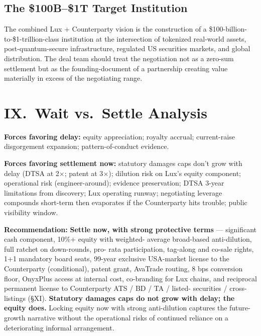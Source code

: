 \documentclass[11pt,letterpaper]{article}
\begin{document}
\subsection*{The \$100B--\$1T Target Institution}

The combined Lux + Counterparty vision is the construction of a
\$100-billion-to-\$1-trillion-class institution at the intersection
of tokenized real-world assets, post-quantum-secure infrastructure,
regulated US securities markets, and global distribution. The deal
team should treat the negotiation not as a zero-sum settlement but
as the founding-document of a partnership creating value materially
in excess of the negotiating range.

\section*{IX.\ Wait vs.\ Settle Analysis}

\textbf{Forces favoring delay:} equity appreciation; royalty accrual;
current-raise disgorgement expansion; pattern-of-conduct evidence.

\textbf{Forces favoring settlement now:} statutory damages caps don't
grow with delay (DTSA at 2$\times$; patent at 3$\times$); dilution risk
on Lux's equity component; operational risk (engineer-around); evidence
preservation; DTSA 3-year limitations from discovery; Lux operating
runway; negotiating leverage compounds short-term then evaporates if
the Counterparty hits trouble; public visibility window.

\textbf{Recommendation:} \textbf{Settle now, with strong protective
terms} --- significant cash component, 10\%+ equity with weighted-
average broad-based anti-dilution, full ratchet on down-rounds, pro-
rata participation, tag-along and co-sale rights, 1+1 mandatory board
seats, 99-year exclusive USA-market license to the Counterparty
(conditional), patent grant, AvaTrade routing, 8 bps conversion floor,
OnyxPlus access at internal cost, co-branding for Lux chains, and
reciprocal permanent license to Counterparty ATS / BD / TA / listed-
securities / cross-listings (\S XI). \textbf{Statutory damages caps
do not grow with delay; the equity does.} Locking equity now with
strong anti-dilution captures the future-growth narrative without
the operational risks of continued reliance on a deteriorating
informal arrangement.

\end{document}
